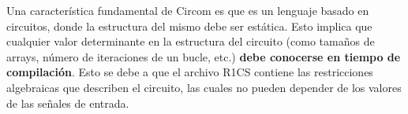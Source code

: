 \documentclass[a4paper,12pt]{report}
\begin{document}
\begin{figura}[H]
{
		}
		\caption{Proceso de transformación a ZKP desde Circom} 
		\label{ex:zkp-transformacion}
	\end{figura}
	
	\vspace{0.3cm}
	
	\noindent Una característica fundamental de Circom es que es un lenguaje basado en circuitos, donde la estructura del mismo debe ser estática. Esto implica que cualquier valor determinante en la estructura del circuito (como tamaños de arrays, número de iteraciones de un bucle, etc.) \textbf{debe conocerse en tiempo de compilación}. Esto se debe a que el archivo R1CS contiene las restricciones algebraicas que describen el circuito, las cuales no pueden depender de los valores de las señales de entrada.
	
\end{document}
